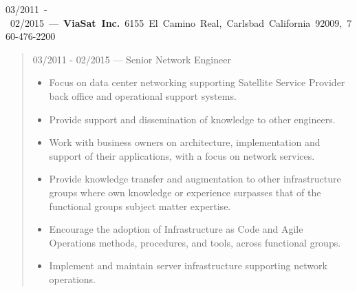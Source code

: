 \mbox{03/2011 - 02/2015 --- {\bf ViaSat Inc.} 6155 El Camino Real, Carlsbad California 92009, 760-476-2200}
\begin{quote}
03/2011 - 02/2015 --- Senior Network Engineer\\
\begin{itemize}
\item Focus on data center networking supporting Satellite Service Provider
back office and operational support systems.
\item Provide support and dissemination of knowledge to other engineers.
\item Work with business owners on architecture, implementation and support of
their applications, with a focus on network services.
\item Provide knowledge transfer and augmentation to other infrastructure groups
where own knowledge or experience surpasses that of the functional groups
subject matter expertise.
\item Encourage the adoption of Infrastructure as Code and Agile Operations
methods, procedures, and tools, across functional groups.
\item Implement and maintain server infrastructure supporting network
operations.
\end{itemize}
\end{quote}
